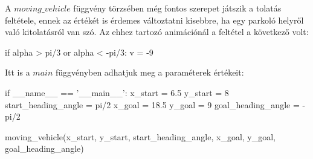 A $ moving\_vehicle $ függvény törzsében még fontos szerepet játszik a tolatás feltétele, ennek az értékét is érdemes változtatni kisebbre, ha egy parkoló helyről való kitolatásról van szó. Az ehhez tartozó animációnál a feltétel a következő volt:

\begin{python}
if alpha > pi/3 or alpha < -pi/3:
      v = -9
\end{python}

Itt is a $ main $ függvényben adhatjuk meg a paraméterek értékeit:

\begin{python}
if __name__ == '__main__':
    x_start = 6.5
    y_start = 8
    start_heading_angle = pi/2
    x_goal = 18.5
    y_goal = 9
    goal_heading_angle = -pi/2

    moving_vehicle(x_start, y_start, start_heading_angle, x_goal, y_goal,
     goal_heading_angle)
\end{python}


